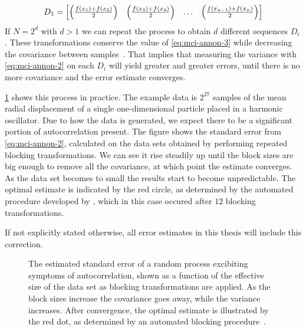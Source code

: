 \documentclass[Thesis.tex]{subfiles}
\begin{document}
\begin{align}
  D_1 = \mqty[\qty(\frac{f(x_1) + f(x_2)}{2}) & \qty(\frac{f(x_3) + f(x_4)}{2}) & \dots & \qty(\frac{f(x_{n-1}) + f(x_n)}{2})]
\end{align}
If $N = 2^d$ with $d > 1$ we can repeat the process to obtain $d$ different
sequences $D_i$. These transformations conserve the value of \cref{eq:mci-annon-3}
while decreasing the covariance between samples~\cite{Jonsson-2018}. That implies that measuring
the variance with \cref{eq:mci-annon-2} on each $D_i$ will yield greater and
greater errors, until there is no more covariance and the error estimate
converges.

\cref{fig:blocking-example-diagram} shows this process in practice. The example
data is $2^{27}$ samples of the mean radial displacement of a single
one-dimensional particle placed in a harmonic oscillator. Due to how the data is
generated, we expect there to be a significant portion of autocorrelation
present. The figure shows the standard error from \cref{eq:mci-annon-2},
calculated on the data sets obtained by performing repeated blocking
transformations. We can see it rise steadily up until the block sizes are big
enough to remove all the covariance, at which point the estimate converges. As
the data set becomes to small the results start to become unpredictable. The
optimal estimate is indicated by the red circle, as determined by the automated
procedure developed by \textcite{Jonsson-2018}, which in this case occured after
$\num{12}$ blocking transformations.

If not explicitly stated otherwise, all error estimates in this thesis will
include this correction.


\begin{figure}[h]
  \centering
  \resizebox{0.7\linewidth}{!}{%
    
  }
  \caption[Standard error as a function of blocking transformations]{The estimated standard error of a random process excibiting symptoms
    of autocorrelation, shown as a function of the effective size of the data set as
    blocking transformations are applied. As the block sizes increase the
    covariance goes away, while the variance increases. After convergence, the
    optimal estimate is illustrated by the red dot, as determined by an automated blocking
    procedure~\cite{Jonsson-2018}.}
  \label{fig:blocking-example-diagram}
\end{figure}
\end{document}
